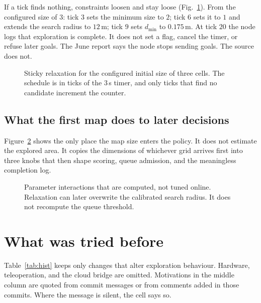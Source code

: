 \documentclass[11pt]{article}
\begin{document}
If a tick finds nothing, constraints loosen and stay loose (Fig.~\ref{fig:relax}). From the configured size of $3$: tick $3$ sets the minimum size to $2$; tick $6$ sets it to $1$ and extends the search radius to $12$\,m; tick $9$ sets $d_{\min}$ to $0.175$\,m. At tick $20$ the node logs that exploration is complete. It does not set a flag, cancel the timer, or refuse later goals. The June report says the node stops sending goals. The source does not.

\begin{figure}[ht]
\centering
\FigRelax
\caption{Sticky relaxation for the configured initial size of three cells. The schedule is in ticks of the $3$\,s timer, and only ticks that find no candidate increment the counter.}
\label{fig:relax}
\end{figure}

\subsection{What the first map does to later decisions}
Figure~\ref{fig:ix} shows the only place the map size enters the policy. It does not estimate the explored area. It copies the dimensions of whichever grid arrives first into three knobs that then shape scoring, queue admission, and the meaningless completion log.

\begin{figure}[ht]
\centering
\FigInteraction
\caption{Parameter interactions that are computed, not tuned online. Relaxation can later overwrite the calibrated search radius. It does not recompute the queue threshold.}
\label{fig:ix}
\end{figure}

\section{What was tried before}
Table~\ref{tab:hist} keeps only changes that alter exploration behaviour. Hardware, teleoperation, and the cloud bridge are omitted. Motivations in the middle column are quoted from commit messages or from comments added in those commits. Where the message is silent, the cell says so.
\end{document}
